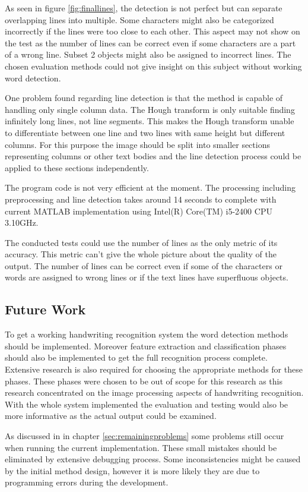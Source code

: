 \documentclass{article}
\begin{document}
      As seen in figure \ref{fig:finallines}, the detection is not perfect but can separate overlapping lines into multiple. Some characters might also be categorized incorrectly if the lines were too close to each other. This aspect may not show on the test as the number of lines can be correct even if some characters are a part of a wrong line. Subset 2 objects might also be assigned to incorrect lines. The chosen evaluation methods could not give insight on this subject without working word detection.

      One problem found regarding line detection is that the method is capable of handling only single column data. The Hough transform is only suitable finding infinitely long lines, not line segments. This makes the Hough transform unable to differentiate between one line and two lines with same height but different columns. For this purpose the image should be split into smaller sections representing columns or other text bodies and the line detection process could be applied to these sections independently.

      The program code is not very efficient at the moment. The processing including preprocessing and line detection takes around 14 seconds to complete with current MATLAB implementation using Intel(R) Core(TM) i5-2400 CPU 3.10GHz.

      The conducted tests could use the number of lines as the only metric of its accuracy. This metric can't give the whole picture about the quality of the output. The number of lines can be correct even if some of the characters or words are assigned to wrong lines or if the text lines have superfluous objects.

    \subsection{Future Work}
      To get a working handwriting recognition system the word detection methods should be implemented. Moreover feature extraction and classification phases should also be implemented to get the full recognition process complete. Extensive research is also required for choosing the appropriate methods for these phases. These phases were chosen to be out of scope for this research as this research concentrated on the image processing aspects of handwriting recognition. With the whole system implemented the evaluation and testing would also be more informative as the actual output could be examined.

      As discussed in in chapter \ref{sec:remainingproblems} some problems still occur when running the current implementation. These small mistakes should be eliminated by extensive debugging process. Some inconsistencies might be caused by the initial method design, however it is more likely they are due to programming errors during the development.
\end{document}

